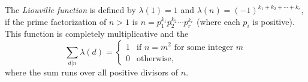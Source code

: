 \documentclass[12pt]{article}
\begin{document}
The \emph{Liouville function} is defined by $\lambda (1) = 1$ and $\lambda (n) = (-1)^{k_1 + k_2 + \cdots + k_r}$, if the prime factorization of $n > 1$ is $n = p_1^{k_1} p_2^{k_2} \cdots p_r^{k_r}$ (where each $p_i$ is positive). This function is completely multiplicative and  the 
\[
\sum_{d|n} \lambda (d) =
\begin{cases}
1 &\text{if $n=m^2$ for some integer $m$}\\
0 &\text{otherwise,}
\end{cases}
\]
where the sum runs over all positive divisors of $n$.
\end{document}
